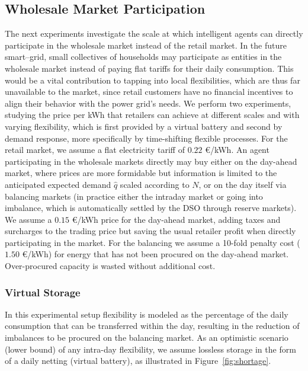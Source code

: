 \documentclass[conference]{IEEEtran}
\begin{document}
\subsection{Wholesale Market Participation}

The next experiments investigate the scale at which intelligent agents can directly participate in the wholesale market instead of the retail market. In the future smart--grid, small collectives of households may participate as entities in the wholesale market instead of paying flat tariffs for their daily consumption. This would be a vital contribution to tapping into local flexibilities, which are thus far unavailable to the market, since retail customers have no financial incentives to align their behavior with the power grid's needs.
We perform two experiments, studying the price per kWh that retailers can achieve at different scales and with varying flexibility, which is first provided by a virtual battery and second by demand response, more specifically by time-shifting flexible processes. For the retail market, we assume a flat electricity tariff of $0.22$ \euro/kWh. An agent participating in the wholesale markets directly may buy either on the day-ahead market, where prices are more formidable but information is limited to the anticipated expected demand $\hat q$ scaled according to $N$, or on the day itself via balancing markets (in practice either the intraday market or going into imbalance, which is automatically settled by the DSO through reserve markets). We assume a $0.15$ \euro/kWh price for the day-ahead market, adding taxes and surcharges to the trading price but saving the usual retailer profit when directly participating in the market. For the balancing we assume a 10-fold penalty cost ($1.50$ \euro/kWh) for energy that has not been procured on the day-ahead market. Over-procured capacity is wasted without additional cost.

\subsubsection{Virtual Storage}

In this experimental setup flexibility is modeled as the percentage of the daily consumption that can be transferred within the day, resulting in the reduction of imbalances to be procured on the balancing market. As an optimistic scenario (lower bound) of any intra-day flexibility, we assume lossless storage in the form of a daily netting (virtual battery), as illustrated in Figure~\ref{fig:shortage}.
\end{document}
